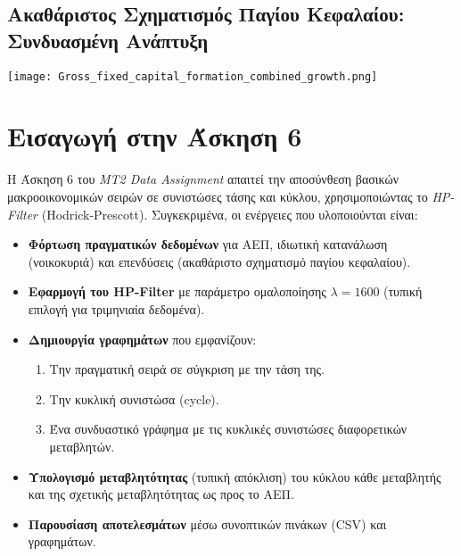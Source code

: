 \documentclass{book}
\begin{document}
\section{Ακαθάριστος Σχηματισμός Παγίου Κεφαλαίου: Συνδυασμένη Ανάπτυξη}
\begin{tcolorbox}[colback=white,colframe=black,title={Gross fixed capital formation: combined growth}]
  \centering
  \texttt{[image: Gross\_fixed\_capital\_formation\_combined\_growth.png]}
  \vspace{0.5em}

\end{tcolorbox}
\FloatBarrier
\chapter{Εισαγωγή στην Άσκηση 6}
Η Άσκηση 6 του \emph{MT2 Data Assignment} απαιτεί την αποσύνθεση βασικών μακροοικονομικών σειρών σε συνιστώσες τάσης και κύκλου, χρησιμοποιώντας το \emph{HP-Filter} (Hodrick-Prescott). Συγκεκριμένα, οι ενέργειες που υλοποιούνται είναι:
\begin{itemize}
  \item \textbf{Φόρτωση πραγματικών δεδομένων} για ΑΕΠ, ιδιωτική κατανάλωση (νοικοκυριά) και επενδύσεις (ακαθάριστο σχηματισμό παγίου κεφαλαίου).
  \item \textbf{Εφαρμογή του HP-Filter} με παράμετρο ομαλοποίησης \(\lambda = 1600\) (τυπική επιλογή για τριμηνιαία δεδομένα).
  \item \textbf{Δημιουργία γραφημάτων} που εμφανίζουν:
    \begin{enumerate}
      \item Την πραγματική σειρά σε σύγκριση με την τάση της.
      \item Την κυκλική συνιστώσα (cycle).
      \item Ένα συνδυαστικό γράφημα με τις κυκλικές συνιστώσες διαφορετικών μεταβλητών.
    \end{enumerate}
  \item \textbf{Υπολογισμό μεταβλητότητας} (τυπική απόκλιση) του κύκλου κάθε μεταβλητής και της σχετικής μεταβλητότητας ως προς το ΑΕΠ.
  \item \textbf{Παρουσίαση αποτελεσμάτων} μέσω συνοπτικών πινάκων (CSV) και γραφημάτων.
\end{itemize}
\end{document}
